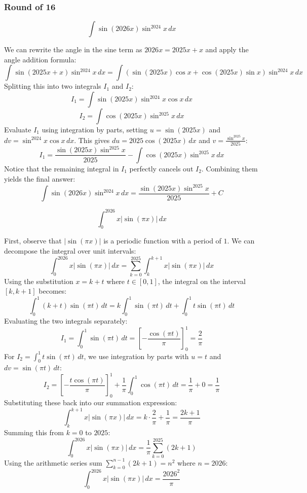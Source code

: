 \subsubsection*{Round of 16}

\begin{questions}

\question
\[ \int \sin(2026x) \sin^{2024} x \,dx \]
\begin{solution}
We can rewrite the angle in the sine term as $2026x = 2025x + x$ and apply the angle addition formula:
\[ \int \sin(2025x + x) \sin^{2024} x \,dx = \int \left( \sin(2025x)\cos x + \cos(2025x)\sin x \right) \sin^{2024} x \,dx \]
Splitting this into two integrals $I_1$ and $I_2$:
\[ I_1 = \int \sin(2025x) \sin^{2024} x \cos x \,dx \]
\[ I_2 = \int \cos(2025x) \sin^{2025} x \,dx \]
Evaluate $I_1$ using integration by parts, setting $u = \sin(2025x)$ and $dv = \sin^{2024} x \cos x \,dx$. This gives $du = 2025 \cos(2025x) \,dx$ and $v = \frac{\sin^{2025} x}{2025}$:
\[ I_1 = \frac{\sin(2025x)\sin^{2025} x}{2025} - \int \cos(2025x) \sin^{2025} x \,dx \]
Notice that the remaining integral in $I_1$ perfectly cancels out $I_2$. Combining them yields the final answer:
\[ \int \sin(2026x) \sin^{2024} x \,dx = \frac{\sin(2025x)\sin^{2025} x}{2025} + C \]
\end{solution}

\question
\[ \int_{0}^{2026} x |\sin(\pi x)| \,dx \]
\begin{solution}
First, observe that $|\sin(\pi x)|$ is a periodic function with a period of $1$. We can decompose the integral over unit intervals:
\[ \int_{0}^{2026} x |\sin(\pi x)| \,dx = \sum_{k=0}^{2025} \int_{k}^{k+1} x |\sin(\pi x)| \,dx \]
Using the substitution $x = k + t$ where $t \in [0, 1]$, the integral on the interval $[k, k+1]$ becomes:
\[ \int_{0}^{1} (k + t) \sin(\pi t) \,dt = k \int_{0}^{1} \sin(\pi t) \,dt + \int_{0}^{1} t \sin(\pi t) \,dt \]
Evaluating the two integrals separately:
\[ I_1 = \int_{0}^{1} \sin(\pi t) \,dt = \left[ -\frac{\cos(\pi t)}{\pi} \right]_{0}^{1} = \frac{2}{\pi} \]
For $I_2 = \int_{0}^{1} t \sin(\pi t) \,dt$, we use integration by parts with $u = t$ and $dv = \sin(\pi t) \,dt$:
\[ I_2 = \left[ -\frac{t \cos(\pi t)}{\pi} \right]_{0}^{1} + \frac{1}{\pi} \int_{0}^{1} \cos(\pi t) \,dt = \frac{1}{\pi} + 0 = \frac{1}{\pi} \]
Substituting these back into our summation expression:
\[ \int_{k}^{k+1} x |\sin(\pi x)| \,dx = k \cdot \frac{2}{\pi} + \frac{1}{\pi} = \frac{2k + 1}{\pi} \]
Summing this from $k = 0$ to $2025$:
\[ \int_{0}^{2026} x |\sin(\pi x)| \,dx = \frac{1}{\pi} \sum_{k=0}^{2025} (2k + 1) \]
Using the arithmetic series sum $\sum_{k=0}^{n-1} (2k+1) = n^2$ where $n = 2026$:
\[ \int_{0}^{2026} x |\sin(\pi x)| \,dx = \frac{2026^2}{\pi} \]
\end{solution}


\end{questions}

